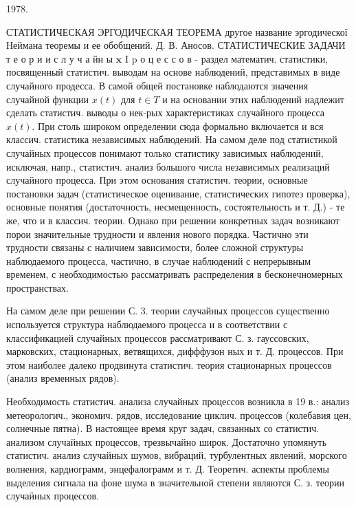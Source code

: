 \documentclass[10pt]{article}
\begin{document}
1978.



СТАТИСТИЧЕСКАЯ ЭРГОДИЧЕСКАЯ ТЕОРЕМА другое название эргодическої Неймана теоремы и ее обобщений. Д. В. Аносов. СТАТИСТИЧЕСКИЕ ЗАДАЧИ т е о р и и с л у ч а йн ы $\mathbf{x}$ I $\mathrm{p}$ о ц е с с о в - раздел математич. статистики, посвященный статистич. выводам на основе наблюдений, представимых в виде случайного продесса. В самой общей постановке наблодаются значения случайной функции $x(t)$ для $t \in T$ и на основании этих наблюдений надлежит сделать статистич. выводы о нек-рых характеристиках случайного процесса $x(t)$. При столь широком определении сюда формально включается и вся классич. статистика независимых наблюдений. На самом деле под статистикой случайных процессов понимают только статистику зависимых наблюдений, исключая, напр., статистич. анализ большого числа независимых реализаций случайного процесса. При этом основания статистич. теории, основные постановки задач (статистическое оценивание, статистических гипотез проверка), основные понятия (достаточность, несмещенность, состоятельность и т. Д.) - те же, что и в классич. теории. Однако при решении конкретных задач возникают порои значительные трудности и явления нового порядка. Частично эти трудности связаны с наличием зависимости, более сложной структуры наблюдаемого процесса, частично, в случае наблюдений с непрерывным временем, с необходимостью рассматривать распределения в бесконечномерных пространствах.



На самом деле при решении С. 3. теории случайных процессов существенно используется структура наблюдаемого процесса и в соответствии с классификацией случайных процессов рассматривают С. з. гауссовских, марковских, стационарных, ветвящихся, дифффузон ных и т. Д. процессов. При этом наиболее далеко продвинута статистич. теория стационарных процессов (анализ временных рядов).



Необходимость статистич. анализа случайных процессов возникла в 19 в.: анализ метеорологич., экономич. рядов, исследование циклич. процессов (колебавия цен, солнечные пятна). В настоящее время круг задач, связанных со статистич. анализом случайных процессов, трезвычайно широк. Достаточно упомянуть статистич. анализ случайных шумов, вибраций, турбулентных явлений, морского волнения, кардиограмм, энцефалограмм и т. Д. Теоретич. аспекты проблемы выделения сигнала на фоне шума в значительной степени являются С. з. теории случаӥных процессов.
\end{document}
